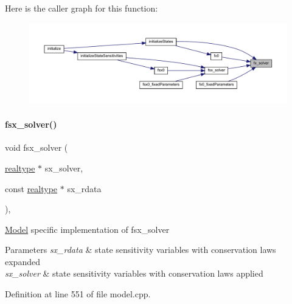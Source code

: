 Here is the caller graph for this function\+:
\nopagebreak
\begin{figure}[H]
\begin{center}
\leavevmode
\includegraphics[width=350pt]{classamici_1_1_model_ac08ad3aa4016a5a3ff89d601e15971cc_icgraph}
\end{center}
\end{figure}
\mbox{\label{classamici_1_1_model_acaa80cbfc886abd3a0f038f5ff9f54e3}} 
\paragraph{\texorpdfstring{fsx\_solver()}{fsx\_solver()}}
{\footnotesize\ttfamily void fsx\+\_\+solver (\begin{DoxyParamCaption}\item[{\mbox{\hyperlink{namespaceamici_a1bdce28051d6a53868f7ccbf5f2c14a3}{realtype}} $\ast$}]{sx\+\_\+solver,  }\item[{const \mbox{\hyperlink{namespaceamici_a1bdce28051d6a53868f7ccbf5f2c14a3}{realtype}} $\ast$}]{sx\+\_\+rdata }\end{DoxyParamCaption})\hspace{0.3cm}{\ttfamily [protected]}, {\ttfamily [virtual]}}

\mbox{\hyperlink{classamici_1_1_model}{Model}} specific implementation of fsx\+\_\+solver 
\begin{DoxyParams}{Parameters}
{\em sx\+\_\+rdata} & state sensitivity variables with conservation laws expanded \\
\hline
{\em sx\+\_\+solver} & state sensitivity variables with conservation laws applied \\
\hline
\end{DoxyParams}


Definition at line 551 of file model.\+cpp.

